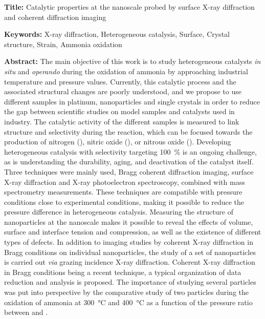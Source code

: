 \small

\begin{mdframed}[linecolor=Prune,linewidth=1]

\textbf{Title:} Catalytic properties at the nanoscale probed by surface X-ray diffraction and coherent diffraction imaging

\noindent \textbf{Keywords:} X-ray diffraction, Heterogeneous catalysis, Surface, Crystal structure, Strain, Ammonia oxidation

\vspace{-.5cm}
\begin{multicols}{2}
\noindent \textbf{Abstract:}
The main objective of this work is to study heterogeneous catalysts \textit{in situ} and \textit{operando} during the oxidation of ammonia by approaching industrial temperature and pressure values.
Currently, this catalytic process and the associated structural changes are poorly understood, and we propose to use different samples in platinum, nanoparticles and single crystals in order to reduce the gap between scientific studies on model samples and catalysts used in industry.
The catalytic activity of the different samples is measured to link structure and selectivity during the reaction, which can be focused towards the production of nitrogen (), nitric oxide (), or nitrous oxide ().
Developing heterogeneous catalysis with selectivity targeting \qty{100}{\percent} is an ongoing challenge, as is understanding the durability, aging, and deactivation of the catalyst itself.
Three techniques were mainly used, Bragg coherent diffraction imaging, surface X-ray diffraction and X-ray photoelectron spectroscopy, combined with mass spectrometry measurements.
These techniques are compatible with pressure conditions close to experimental conditions, making it possible to reduce the pressure difference in heterogeneous catalysis.
Measuring the structure of nanoparticles at the nanoscale makes it possible to reveal the effects of volume, surface and interface tension and compression, as well as the existence of different types of defects.
In addition to imaging studies by coherent X-ray diffraction in Bragg conditions on individual nanoparticles, the study of a set of nanoparticles is carried out \textit{via} grazing incidence X-ray diffraction.
Coherent X-ray diffraction in Bragg conditions being a recent technique, a typical organization of data reduction and analysis is proposed.
The importance of studying several particles was put into perspective by the comparative study of two particles during the oxidation of ammonia at \qty{300}{\degreeCelsius} and \qty{400}{\degreeCelsius} as a function of the pressure ratio between  and .

\end{multicols}
\end{mdframed}
